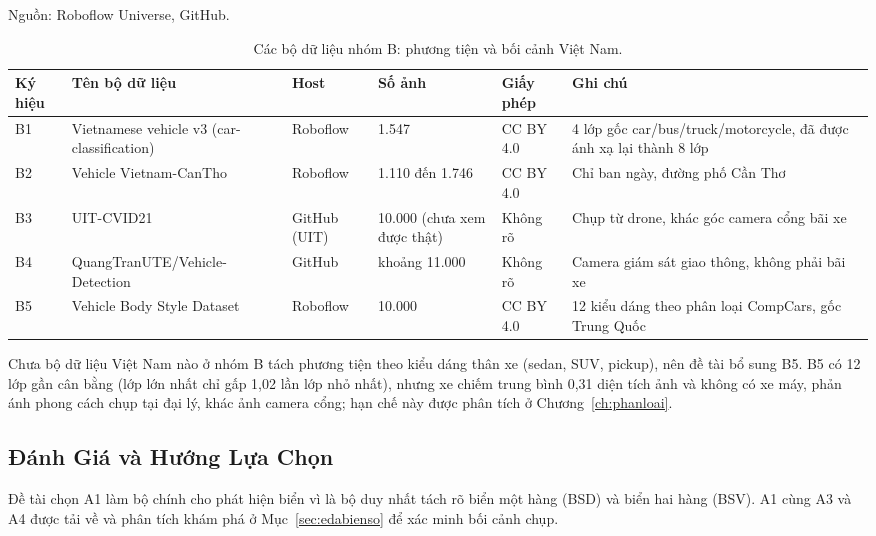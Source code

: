 \begin{table}[htbp]
\centering
\caption{Các bộ dữ liệu nhóm B: phương tiện và bối cảnh Việt Nam.}

{\footnotesize Nguồn: Roboflow Universe, GitHub.}
\label{tab:dataset-b}
\small
\begin{tabular}{p{0.8cm} p{3.4cm} p{1.4cm} p{1.3cm} p{1.4cm} p{2.5cm}}
\toprule
\textbf{Ký hiệu} & \textbf{Tên bộ dữ liệu} & \textbf{Host} & \textbf{Số ảnh} & \textbf{Giấy phép} & \textbf{Ghi chú} \\
\midrule
B1 & Vietnamese vehicle v3 (car-classification)~\autocite{carclassification2023vnvehicle} & Roboflow & 1.547 & CC BY 4.0 & 4 lớp gốc car/bus/truck/motorcycle, đã được ánh xạ lại thành 8 lớp \\
B2 & Vehicle Vietnam-CanTho~\autocite{vehicle2022cantho} & Roboflow & 1.110 đến 1.746 & CC BY 4.0 & Chỉ ban ngày, đường phố Cần Thơ \\
B3 & UIT-CVID21~\autocite{uitcvid21} & GitHub (UIT) & 10.000 (chưa xem được thật) & Không rõ & Chụp từ drone, khác góc camera cổng bãi xe \\
B4 & QuangTranUTE/Vehicle-Detection & GitHub & khoảng 11.000 & Không rõ & Camera giám sát giao thông, không phải bãi xe \\
B5 & Vehicle Body Style Dataset~\autocite{researchprojects2022vehiclebodystyle} & Roboflow & 10.000 & CC BY 4.0 & 12 kiểu dáng theo phân loại CompCars, gốc Trung Quốc \\
\bottomrule
\end{tabular}
\end{table}

Chưa bộ dữ liệu Việt Nam nào ở nhóm B tách phương tiện theo kiểu dáng thân xe (sedan, SUV,
pickup), nên đề tài bổ sung B5. B5 có 12 lớp gần cân bằng (lớp lớn nhất chỉ gấp 1,02 lần lớp nhỏ
nhất), nhưng xe chiếm trung bình 0,31 diện tích ảnh và không có xe máy, phản ánh phong cách
chụp tại đại lý, khác ảnh camera cổng; hạn chế này được phân tích ở
Chương~\ref{ch:phanloai}.

\subsection{Đánh Giá và Hướng Lựa Chọn}
\label{sec:chondataset}

Đề tài chọn A1 làm bộ chính cho phát hiện biển vì là bộ duy nhất tách rõ biển một hàng
(BSD) và biển hai hàng (BSV). A1 cùng A3 và A4 được tải về và phân tích khám phá ở
Mục~\ref{sec:edabienso} để xác minh bối cảnh chụp.

